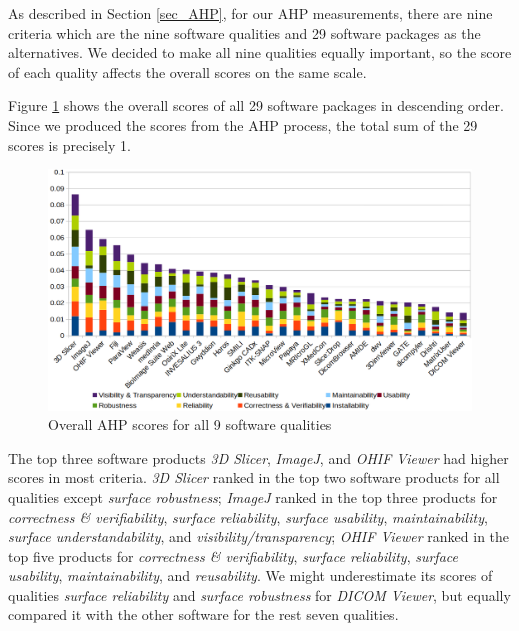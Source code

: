 As described in Section \ref{sec_AHP}, for our AHP measurements, there are nine criteria which are the nine software qualities and 29 software packages as the alternatives. We decided to make all nine qualities equally important, so the score of each quality affects the overall scores on the same scale.

Figure \ref{fg_overall_scores} shows the overall scores of all 29 software packages in descending order. Since we produced the scores from the AHP process, the total sum of the 29 scores is precisely 1.

\begin{figure}[H]
\includegraphics[scale=0.38]{figures/overall_scores.png}
\caption{Overall AHP scores for all 9 software qualities}

\label{fg_overall_scores}
\end{figure}

The top three software products \textit{3D Slicer}, \textit{ImageJ}, and \textit{OHIF Viewer} had higher scores in most criteria. \textit{3D Slicer} ranked in the top two software products for all qualities except \textit{surface robustness}; \textit{ImageJ} ranked in the top three products for \textit{correctness \& verifiability}, \textit{surface reliability}, \textit{surface usability}, \textit{maintainability}, \textit{ surface understandability}, and \textit{visibility/transparency}; \textit{OHIF Viewer} ranked in the top five products for \textit{correctness \& verifiability}, \textit{surface reliability}, \textit{surface usability}, \textit{maintainability}, and \textit{reusability}. We might underestimate its scores of qualities \textit{surface reliability} and \textit{surface robustness} for \textit{DICOM Viewer}, but equally compared it with the other software for the rest seven qualities.
